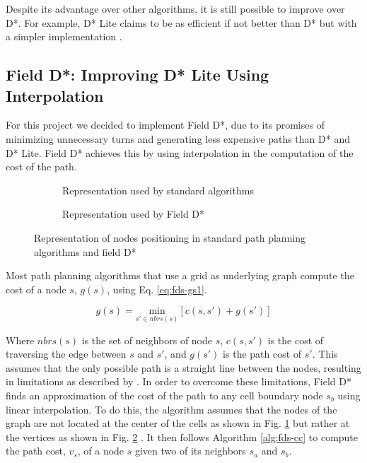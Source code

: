Despite its advantage over other algorithms, it is still possible to improve over D*. For example, D* Lite 
claims to be as efficient if not better than D* but with a simpler implementation \autocite{SK05}.

\subsection{Field D*: Improving D* Lite Using Interpolation}

For this project we decided to implement Field D*, due to its promises of minimizing unnecessary turns and
generating less expensive paths than D* and D* Lite. Field D* achieves this by using interpolation in the 
computation of the cost of the path. \autocite{DF06}

\begin{figure}
	\begin{center}
		\begin{subfigure}{0.5\textwidth}\centering
			
			\caption{Representation used by standard algorithms}\label{fig:fds-cell-1}
		\end{subfigure}
		\begin{subfigure}{0.4\textwidth}\centering
			
			\caption{Representation used by Field D*}\label{fig:fds-cell-2}
		\end{subfigure}
	\end{center}
	\caption{Representation of nodes positioning in standard path planning algorithms and field D*}\label{fig:fds-cell}
\end{figure}


Most path planning algorithms that use a grid as underlying graph compute the cost of a node $s$, $g(s)$, using 
Eq. \ref{eq:fds-gs1}.

\begin{equation}
	g(s) = \underset{s' \in nbrs(s)}{\mathrm{min}} [c(s,s') + g(s')]
	\label{eq:fds-gs1}
\end{equation}

Where $nbrs(s)$ is the set of neighbors of node $s$, $c(s,s')$ is the cost of traversing the edge between $s$ and
$s'$, and $g(s')$ is the path cost of $s'$. This assumes that the only possible path is a straight line between
the nodes, resulting in limitations as described by \autocite{DF06}. In order to overcome these limitations,
Field D* finds an approximation of the cost of the path to any cell boundary node $s_b$ using linear interpolation.
To do this, the algorithm assumes that the nodes of the graph are not located at the center of the cells as shown in Fig. \ref{fig:fds-cell-1} but rather
at the vertices as shown in Fig. \ref{fig:fds-cell-2} \autocite{DF06}. It then follows Algorithm \ref{alg:fds-cc} to compute the path cost, $v_s$, of a node $s$ given
two of its neighbors $s_a$ and $s_b$.

